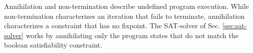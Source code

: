 \documentclass[preprint]{sigplanconf}
\newcommand{\lcal}{\ensuremath{\lambda}-calculus\xspace}
\begin{document}
Annihilation and non-termination describe undefined program
execution. While non-termination characterizes an iteration that fails
to terminate, annihilation characterizes a constraint that has no
fixpoint. The SAT-solver of Sec. \ref{sec:sat-solver} works by
annihilating only the program states that do not match the boolean
satisfiability constraint.
\end{document}

